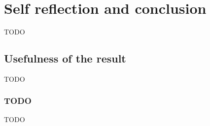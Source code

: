 
\chapter{Self reflection and conclusion}
\label{ch:conclusion}
TODO

\section{Usefulness of the result }
\label{sec:conclusion_usefulness}
TODO


\subsection{TODO}
\label{subsec:conclusion_usefulness_XXX}
TODO

